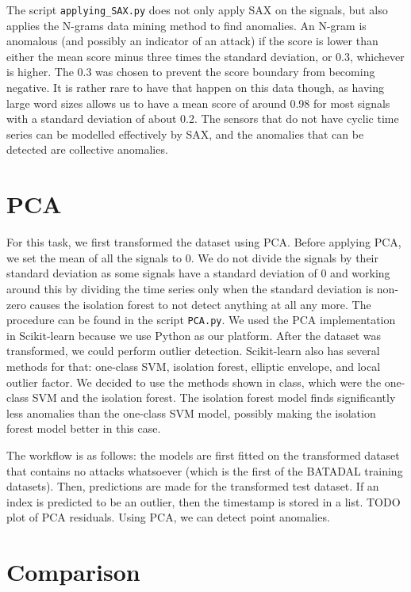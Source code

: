 \documentclass[]{article}
\begin{document}
The script \texttt{applying\_SAX.py} does not only apply SAX on the signals, but also applies the N-grams data mining method to find anomalies. An N-gram is anomalous (and possibly an indicator of an attack) if the score is lower than either the mean score minus three times the standard deviation, or 0.3, whichever is higher. The 0.3 was chosen to prevent the score boundary from becoming negative. It is rather rare to have that happen on this data though, as having large word sizes allows us to have a mean score of around 0.98 for most signals with a standard deviation of about 0.2. The sensors that do not have cyclic time series can be modelled effectively by SAX, and the anomalies that can be detected are collective anomalies.
\clearpage
\section{PCA}
For this task, we first transformed the dataset using PCA. Before applying PCA, we set the mean of all the signals to 0. We do not divide the signals by their standard deviation as some signals have a standard deviation of 0 and working around this by dividing the time series only when the standard deviation is non-zero causes the isolation forest to not detect anything at all any more. The procedure can be found in the script \texttt{PCA.py}. We used the PCA implementation in Scikit-learn because we use Python as our platform. After the dataset was transformed, we could perform outlier detection. Scikit-learn also has several methods for that: one-class SVM, isolation forest, elliptic envelope, and local outlier factor. We decided to use the methods shown in class, which were the one-class SVM and the isolation forest. The isolation forest model finds significantly less anomalies than the one-class SVM model, possibly making the isolation forest model better in this case.

The workflow is as follows: the models are first fitted on the transformed dataset that contains no attacks whatsoever (which is the first of the BATADAL training datasets). Then, predictions are made for the transformed test dataset. If an index is predicted to be an outlier, then the timestamp is stored in a list. TODO plot of PCA residuals. Using PCA, we can detect point anomalies.
\clearpage
\section{Comparison} 
\end{document}
